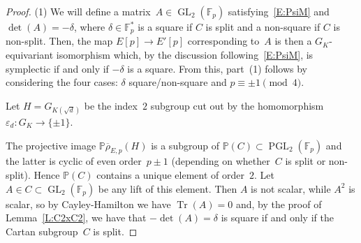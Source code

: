 \documentclass[12pt, reqno]{amsart}
\newcommand{\Fp}{\mathbb{F}_p}
\newcommand{\Fpstar}{\mathbb{F}_p^*}
\newcommand{\PP}{\mathbb{P}}
\newcommand{\rhobar}{{\overline{\rho}}}
\DeclareMathOperator{\Tr}{Tr}
\newcommand{\GL}{\operatorname{GL}}
\newcommand{\PGL}{\operatorname{PGL}}
\numberwithin{equation}{section}
\theoremstyle{definition}
\theoremstyle{remark}
\newcommand{\nf}[1]{{\color{blue} \textsf{[NF: #1]}}}
\newcommand{\jc}[1]{{\color{darkgreen} \textsf{[JC: #1]}}}
\begin{document}
\begin{proof} 
\begin{comment}
\nf{First version:}

From the hypothesis we can 
choose a basis $P_1, P_2$ of $E[p]$ such that 
$\rhobar_{E,p}$ has image 
contained in the subgroup of $\GL_2(\Fp)$ given by 
\[
\left\{ 
\begin{pmatrix}
a & b\delta \\
b & a
\end{pmatrix}, 
\begin{pmatrix}
a & b\delta \\
-b & -a
\end{pmatrix}  \; : a, b \in \Fp, \; a^2 - \delta b^2 \neq 0 \right\},
\]
where~$C$ is given by the first type of matrices. 
Restricting~\eqref{E:PsiM} to $H$, we see that 
that~$M \in C$ because $\rhobar_{E,p}(H) \subset C$; also, $M$ 
is non-scalar since the twist is non-trivial,
thus~$b \neq 0$. 
Moreover, for $\tau \in G_K - H$ we have 
$M \rhobar_{E,p}(\tau) M^{-1} =-\rhobar_{E,p}(\tau)$ and so $M^2$ commutes with 
$\rhobar_{E,p}(\tau)$, thus it commutes with the whole (non-abelian) image 
of~$\rhobar_{E,p}$. Thus $M^2$ is scalar, hence 
$M$ has projective order~$2$ and so it has trace 0.

We conclude that $\Tr M = 2a = 0$, so $a=0$ (as $p \neq 2$) and $\det
M = -b^2\delta$. Thus $\det M$ is a square mod~$p$ if and only
if~$-\delta$ is a square. Part (1) follows by dividing this condition
into the four different cases.

\jc{Second version:}
\end{comment}

(1) We will define a matrix~$A\in\GL_2(\Fp)$ satisfying~\eqref{E:PsiM}
and $\det(A)=-\delta$,
where $\delta \in \Fpstar$ is a square if $C$ is split and a non-square
if $C$ is non-split.   
Then, the map $E[p]\to E'[p]$ corresponding to~$A$
is then a
$G_K$-equivariant isomorphism which, 
by the discussion following~\eqref{E:PsiM}, 
is symplectic if and only if
$-\delta$ is a square.  From this, 
part~(1) follows by considering the four cases:
$\delta$ square/non-square and $p\equiv\pm1\pmod4$.


Let $H=G_{K(\sqrt{d})}$ be the index~$2$ subgroup cut out by 
the homomorphism~$\varepsilon_d:G_K\to\{\pm 1 \}$.

The projective image $\PP \rhobar_{E,p}(H)$ is a subgroup of $\PP(C) \subset \PGL_2(\Fp)$ and the latter is cyclic of even order~$p\pm1$
(depending on whether~$C$ is split or non-split). Hence $\PP(C)$ contains
a unique element of order~$2$. 
Let $A \in C \subset \GL_2(\Fp)$ be any lift of this element.  Then $A$ is
not scalar, while $A^2$ is scalar, so by Cayley-Hamilton we have
$\Tr(A)=0$ and, 
by the proof of Lemma~\ref{L:C2xC2}, we have that
$-\det(A) = \delta$ is square if and only if the Cartan subgroup~$C$ is split.


\end{proof}
\end{document}
